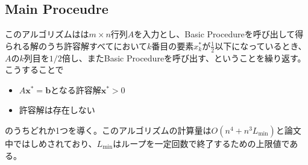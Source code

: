 \subsection{Main Proceudre}
このアルゴリズムはは$m \times n$行列$A$を入力とし、Basic Procedureを呼び出して得られる解のうち許容解すべてにおいて$k$番目の要素$x_k^*$が$\frac{1}{2}$以下になっているとき、$A$の$k$列目を$1 / 2$倍し、またBasic Procedureを呼び出す、ということを繰り返す。こうすることで
\begin{itemize}
  \item $A\mathbf{x}^*=\mathbf{b}$となる許容解$\mathbf{x}^* > 0$
  \item 許容解は存在しない
\end{itemize}
のうちどれか1つを導く。このアルゴリズムの計算量は$O\left(n^4 + n^3 L_{\text{min}}\right)$と論文中ではしめされており、$L_{\text{min}}$はループを一定回数で終了するための上限値である。
